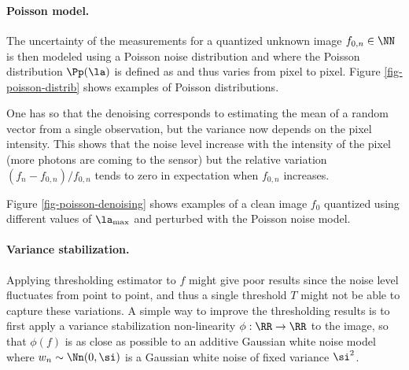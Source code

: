 \paragraph{Poisson model.}

The uncertainty of the measurements for a quantized unknown image $f_{0,n} \in \NN$ is then modeled using a Poisson noise distribution 
and where the Poisson distribution $\Pp(\la)$ is defined as
and thus varies from pixel to pixel. Figure \ref{fig-poisson-distrib} shows examples of Poisson distributions.


One has 
so that the denoising corresponds to estimating the mean of a random vector from a single observation, but the variance now depends on the pixel intensity. This shows that the noise level increase with the intensity of the pixel (more photons are coming to the sensor) but the relative variation $(f_n-f_{0,n})/f_{0,n}$ tends to zero in expectation when $f_{0,n}$ increases.

Figure \ref{fig-poisson-denoising} shows examples of a clean image $f_0$ quantized using different values of $\la_{\max}$ and perturbed with the Poisson noise model.


\paragraph{Variance stabilization.}

Applying thresholding estimator 
to $f$ might give poor results since the noise level fluctuates from point to point, and thus a single threshold $T$ might not be able to capture these variations. A simple way to improve the thresholding results is to first apply a variance stabilization non-linearity $\phi : \RR \rightarrow \RR$ to the image, so that $\phi(f)$ is as close as possible to an additive Gaussian white noise model
where $w_n \sim \Nn(0,\si)$ is a Gaussian white noise of fixed variance $\si^2$.

